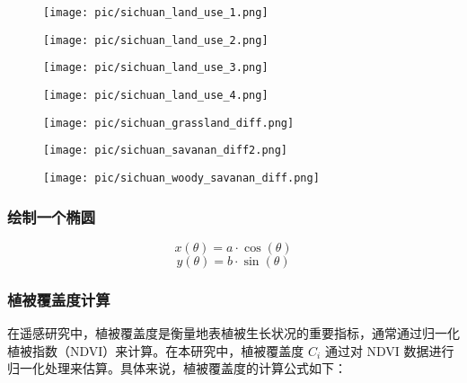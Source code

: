 \documentclass{article}
\begin{document}
		
		
		\begin{figure}[H]  %
			\centering
			\texttt{[image: pic/sichuan\_land\_use\_1.png]} %
		\end{figure}
		\begin{figure}[H]  %
			\centering
			\texttt{[image: pic/sichuan\_land\_use\_2.png]} %
		\end{figure}
		\begin{figure}[H]  %
			\centering
			\texttt{[image: pic/sichuan\_land\_use\_3.png]} %
		\end{figure}
		\begin{figure}[H]  %
			\centering
			\texttt{[image: pic/sichuan\_land\_use\_4.png]} %
		\end{figure}
				\begin{figure}[H]  %
			\centering
			\texttt{[image: pic/sichuan\_grassland\_diff.png]} %
		\end{figure}
						\begin{figure}[H]  %
			\centering
			\texttt{[image: pic/sichuan\_savanan\_diff2.png]} %
		\end{figure}
			\begin{figure}[H]  %
			\centering
			\texttt{[image: pic/sichuan\_woody\_savanan\_diff.png]} %
		\end{figure}
		\subsubsection{绘制一个椭圆}
		
		\[
		x(\theta) = a \cdot \cos(\theta)
		\]
		\[
		y(\theta) = b \cdot \sin(\theta)
		\]
		\subsubsection{植被覆盖度计算}
		
		
		在遥感研究中，植被覆盖度是衡量地表植被生长状况的重要指标，通常通过归一化植被指数（NDVI）来计算。在本研究中，植被覆盖度 \( C_i \) 通过对 NDVI 数据进行归一化处理来估算。具体来说，植被覆盖度的计算公式如下：
		
\end{document}
